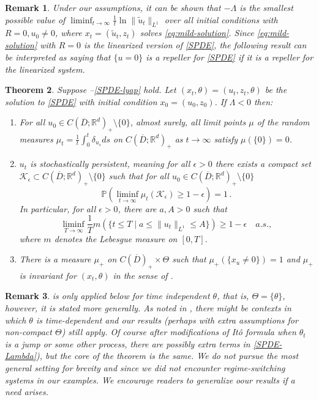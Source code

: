 \documentclass[final]{amsart}
\newtheorem{thm}{Theorem}
\newtheorem{rem}[thm]{Remark}
\numberwithin{thm}{section}
\numberwithin{equation}{section}
\newcommand{\Prb}{\mathbb{P}}
\newcommand{\R}{\mathbb{R}}
\newcommand{\K}{\mathcal{K}}
\newcommand{\cdom}{C(\overline D)_+}
\begin{document}
\begin{rem}
    Under our assumptions, it can be shown that $-\Lambda$ is the smallest possible value of $\liminf_{t \to \infty} \frac{1}{t}\ln \|\tilde u_t\|_{L^1}$ over all initial conditions with $R = 0, u_0 \neq 0$, where $x_t = (\tilde u_t,z_t)$ solves \eqref{eq:mild-solution}. Since \eqref{eq:mild-solution} with $R = 0$ is the linearized version of \eqref{SPDE}, the following result can be interpreted as saying that $\{u = 0\}$ is a repeller for \eqref{SPDE} if it is a repeller for the linearized system.
\end{rem}
\begin{thm}\label{main-SPDE-thm}
Suppose --\ref{SPDE-lyap} hold. Let $(x_t, \theta) = (u_t,z_t,\theta)$ be the solution to \eqref{SPDE} with initial condition $x_0 = (u_0,z_0)$. If $\Lambda < 0$ then:
\begin{enumerate}[label=(\roman*)]
     \item For all $u_0 \in C(\overline D;\R^d)_+ \setminus \{0\}$, almost surely, all limit points $\mu$ of the random measures $\mu_t = \frac{1}{t}\int_0^t \delta_{u_s}ds$ on $C(\overline D;\R^d)_+$ as $t \to \infty$ satisfy $\mu(\{0\}) = 0$.
        \item $u_t$ is stochastically persistent, meaning for all $\epsilon > 0$ there exists a compact set $\K_\epsilon \subset C(\overline D;\R^d)_+ \setminus \{0\}$ such that for all $u_0 \in C(\overline D;\R^d)_+ \setminus \{0\}$
        $$\Prb(\liminf_{t \to \infty} \mu_t(\K_\epsilon) \geq 1 - \epsilon) = 1 \,.$$
        In particular, for all $\epsilon > 0$, there are $a,A > 0$ such that
        $$\liminf_{T \to \infty} \frac{1}{T} m(\{t \leq T \mid a \leq \|u_t\|_{L^1} \leq A\}) \geq 1 -\epsilon \quad a.s.,
        $$
        where $m$ denotes the Lebesgue measure on $[0,T]$.
        
        \item There is a measure $\mu_+$ on $\cdom \times \Theta$ such that $\mu_+(\{x_u \neq 0\}) = 1$ and $\mu_+$ is invariant for $(x_t,\theta)$ in the sense of .
\end{enumerate}
\end{thm}


\begin{rem}
     is only applied below for time independent $\theta$, that is, $\Theta = \{\theta\}$,  however, it is stated more generally. As noted in , there might be contexts in which $\theta$ is time-dependent and our results (perhaps with extra assumptions for non-compact $\Theta$) still apply. Of course after modifications of It\^{o} formula when $\theta_t$ is a jump or some other process, there are possibly extra terms in \eqref{SPDE-Lambda}), but the core of the theorem is the same. We do not pursue the most general setting for brevity and since we did not encounter regime-switching systems in our examples. We encourage readers to generalize oour results if a need arises. 
\end{rem}
\end{document}
